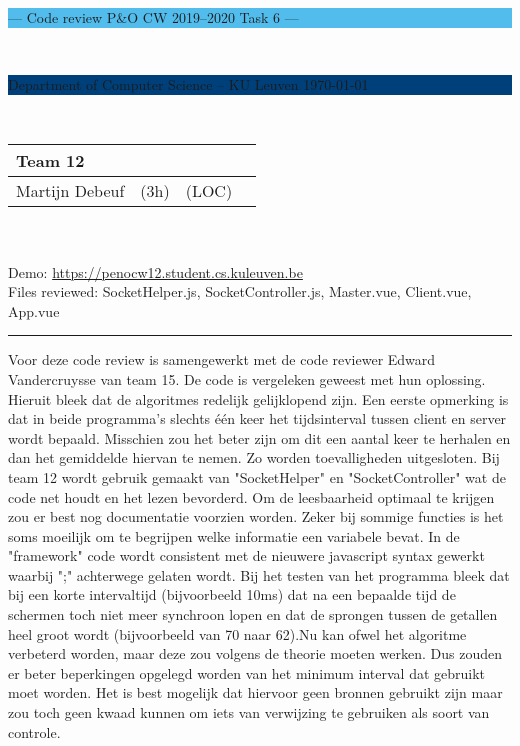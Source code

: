 \documentclass[a4paper,11pt]{article}
\begin{document}
\noindent
\colorbox[HTML]{52BDEC}{\bfseries\parbox{\textwidth}{\centering\large
  --- Code review P\&O CW 2019--2020 Task 6 ---
}}
\\[-1mm]
\colorbox[HTML]{00407A}{\bfseries\color{white}\parbox{\textwidth}{
  Department of Computer Science -- KU Leuven
  \hfill
  \today
}}
\\

\smallskip

\noindent
\begin{tabular}{*4l}
\toprule
\multicolumn{3}{l}{\large\textbf{Team 12}} \\
\midrule
Martijn Debeuf & (3h) &  (LOC) \\ %
\bottomrule
\hline
\end{tabular}\\
\\
Demo: \url{https://penocw12.student.cs.kuleuven.be} \\
Files reviewed: SocketHelper.js, SocketController.js, Master.vue, Client.vue, App.vue

\noindent
{\color[HTML]{52BDEC} \rule{\linewidth}{1mm} }

\smallskip

Voor deze code review is samengewerkt met de code reviewer Edward Vandercruysse van team 15.
De code is vergeleken geweest met hun oplossing. Hieruit bleek dat de algoritmes redelijk gelijklopend zijn.
Een eerste opmerking is dat in beide programma's slechts één keer het tijdsinterval tussen client en server wordt bepaald. Misschien zou het beter zijn om dit een aantal keer te herhalen en dan het gemiddelde hiervan te nemen. Zo worden toevalligheden uitgesloten. Bij team 12 wordt gebruik gemaakt van "SocketHelper" en "SocketController" wat de code net houdt en het lezen bevorderd. Om de leesbaarheid optimaal te krijgen zou er best nog documentatie voorzien worden. Zeker bij sommige functies is het soms moeilijk om te begrijpen welke informatie een variabele bevat. In de "framework" code wordt consistent met de nieuwere javascript syntax gewerkt waarbij ";" achterwege gelaten wordt. Bij het testen van het programma bleek dat bij een korte intervaltijd (bijvoorbeeld 10ms) dat na een bepaalde tijd de schermen toch niet meer synchroon lopen en dat de sprongen tussen de getallen heel groot wordt (bijvoorbeeld van 70 naar 62).Nu kan ofwel het algoritme verbeterd worden, maar deze zou volgens de theorie moeten werken. Dus zouden er beter beperkingen opgelegd worden van het minimum interval dat gebruikt moet worden. Het is best mogelijk dat hiervoor geen bronnen gebruikt zijn maar zou toch geen kwaad kunnen om iets van verwijzing te gebruiken als soort van controle.
\end{document}
